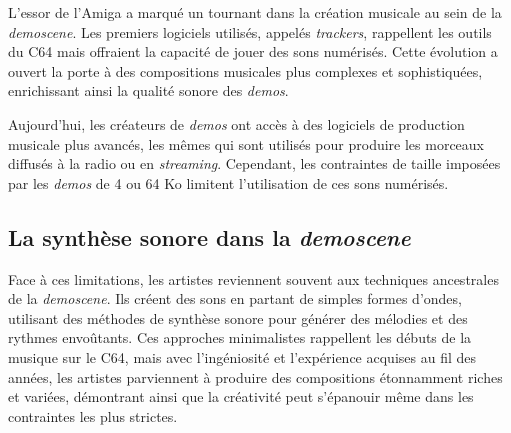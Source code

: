 L'essor de l'Amiga a marqué un tournant dans la création musicale au sein de la \textit{demoscene}. Les premiers logiciels utilisés, appelés \textit{trackers}, rappellent les outils du C64 mais offraient la capacité de jouer des sons numérisés. Cette évolution a ouvert la porte à des compositions musicales plus complexes et sophistiquées, enrichissant ainsi la qualité sonore des \textit{demos}.

Aujourd'hui, les créateurs de \textit{demos} ont accès à des logiciels de production musicale plus avancés, les mêmes qui sont utilisés pour produire les morceaux diffusés à la radio ou en \textit{streaming}. Cependant, les contraintes de taille imposées par les \textit{demos} de 4 ou 64 Ko limitent l'utilisation de ces sons numérisés.

\subsection*{La synthèse sonore dans la \textit{demoscene}}

Face à ces limitations, les artistes reviennent souvent aux techniques ancestrales de la \textit{demoscene}. Ils créent des sons en partant de simples formes d'ondes, utilisant des méthodes de synthèse sonore pour générer des mélodies et des rythmes envoûtants. Ces approches minimalistes rappellent les débuts de la musique sur le C64, mais avec l'ingéniosité et l'expérience acquises au fil des années, les artistes parviennent à produire des compositions étonnamment riches et variées, démontrant ainsi que la créativité peut s'épanouir même dans les contraintes les plus strictes.


